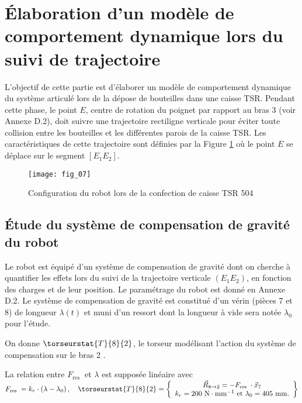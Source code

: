 \section{Élaboration d'un modèle de comportement dynamique lors du suivi de trajectoire}

L'objectif de cette partie est d'élaborer un modèle de comportement dynamique du système articulé lors de la dépose de bouteilles dans une caisse TSR. Pendant cette phase, le point $E$, centre de rotation du poignet par rapport au bras 3 (voir Annexe D.2), doit suivre une trajectoire rectiligne verticale pour éviter toute collision entre les bouteilles et les différentes parois de la caisse TSR. Les caractéristiques de cette trajectoire sont définies par la Figure \ref{fig:07} où le point $E$ se déplace sur le segment $\left[E_{1} E_{2}\right]$.

\begin{figure}[!h]
\centering
\texttt{[image: fig\_07]}
\caption{Configuration du robot lors de la confection de caisse TSR 504 \label{fig:07}}
\end{figure}


\subsection{Étude du système de compensation de gravité du robot}
Le robot est équipé d'un système de compensation de gravité dont on cherche à quantifier les effets lors du suivi de la trajectoire verticale $\left(E_{1} E_{2}\right)$, en fonction des charges et de leur position. Le paramétrage du robot est donné en Annexe D.2. Le système de compensation de gravité est constitué d'un vérin (pièces 7 et 8) de longueur $\lambda(t)$ et muni d'un ressort dont la longueur à vide sera notée $\lambda_{0}$ pour l'étude.

On donne $\torseurstat{T}{8}{2}$, le torseur modélisant l'action du système de compensation sur le bras 2 .

La relation entre $F_{\text {res }}$ et $\lambda$ est supposée linéaire avec $F_{\text {res }}=k_{r} \cdot\left(\lambda-\lambda_{0}\right), \quad \torseurstat{T}{8}{2}=\left\{\begin{array}{c}\vec{R}_{8 \rightarrow 2}=-F_{\text {res }} \cdot \vec{x}_{7} \\ k_{r}=200 \mathrm{~N} \cdot \mathrm{mm}^{-1} \text { et } \lambda_{0}=405 \mathrm{~mm} .\end{array}\right\}$


